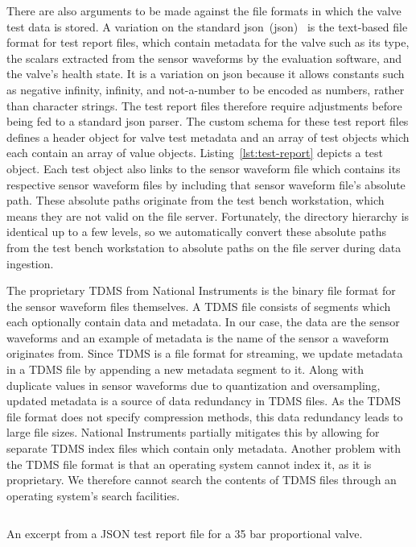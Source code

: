 There are also arguments to be made against the file formats in which the valve test data is stored.
A variation on the standard \acrlong{json}~(\acrshort{json})~\citep{DBLP:journals/rfc/rfc8259} is the text-based file format for test report files, which contain metadata for the valve such as its type, the scalars extracted from the sensor waveforms by the evaluation software, and the valve's health state.
It is a variation on \acrshort{json} because it allows constants such as negative infinity, infinity, and not-a-number to be encoded as numbers, rather than character strings.
The test report files therefore require adjustments before being fed to a standard \acrshort{json} parser.
The custom schema for these test report files defines a header object for valve test metadata and an array of test objects which each contain an array of value objects.
Listing~\ref{lst:test-report} depicts a test object.
Each test object also links to the sensor waveform file which contains its respective sensor waveform files by including that sensor waveform file's absolute path.
These absolute paths originate from the test bench workstation, which means they are not valid on the file server.
Fortunately, the directory hierarchy is identical up to a few levels, so we automatically convert these absolute paths from the test bench workstation to absolute paths on the file server during data ingestion.

The proprietary TDMS from National Instruments \citep{nitdms} is the binary file format for the sensor waveform files themselves.
A TDMS file consists of segments which each optionally contain data and metadata.
In our case, the data are the sensor waveforms and an example of metadata is the name of the sensor a waveform originates from.
Since TDMS is a file format for streaming, we update metadata in a TDMS file by appending a new metadata segment to it.
Along with duplicate values in sensor waveforms due to quantization and oversampling, updated metadata is a source of data redundancy in TDMS files.
As the TDMS file format does not specify compression methods, this data redundancy leads to large file sizes.
National Instruments partially mitigates this by allowing for separate TDMS index files which contain only metadata.
Another problem with the TDMS file format is that an operating system cannot index it, as it is proprietary.
We therefore cannot search the contents of TDMS files through an operating system's search facilities.

\begin{listing}
  \inputminted[firstline=101,lastline=124,breaklines=true]{json}{test_report.json}
  \caption{An excerpt from a JSON test report file for a 35 bar proportional valve.}
  \label{lst:test-report}
\end{listing}

